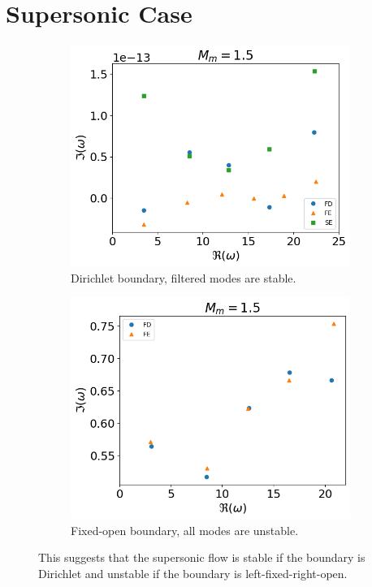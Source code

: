 \section{Supersonic Case}
\begin{figure} [H]
  \centering
  \begin{subfigure}{0.45\textwidth}
    \centering
    \includegraphics[width=\linewidth]{figures/numerical-experiments/fixed-fixed/supersonic-v}
    \caption{Dirichlet boundary, filtered modes are stable.}
  \end{subfigure}%
  \begin{subfigure}{0.45\textwidth}
    \centering
    \includegraphics[width=\linewidth]{figures/numerical-experiments/fixed-open/supersonic-v}
    \caption{Fixed-open boundary, all modes are unstable.}
  \end{subfigure}
  \caption{This suggests that the supersonic flow is stable if the boundary is Dirichlet and unstable if the boundary is left-fixed-right-open.}
\end{figure}


